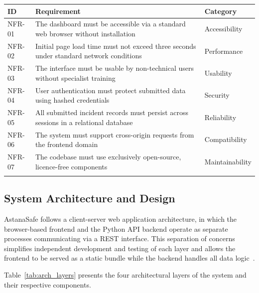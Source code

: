 \documentclass[12pt,a4paper]{report}
\begin{document}
  \renewcommand{\arraystretch}{1.4}
  \begin{tabularx}{\textwidth}{|>{\centering\arraybackslash}p{1.6cm}
                                |>{\raggedright\arraybackslash}X
                                |>{\centering\arraybackslash}p{2.8cm}|}
    \hline
    \textbf{ID} & \textbf{Requirement} & \textbf{Category} \\
    \hline
    NFR-01 & The dashboard must be accessible via a standard web browser without installation & Accessibility \\
    \hline
    NFR-02 & Initial page load time must not exceed three seconds under standard network conditions & Performance \\
    \hline
    NFR-03 & The interface must be usable by non-technical users without specialist training & Usability \\
    \hline
    NFR-04 & User authentication must protect submitted data using hashed credentials & Security \\
    \hline
    NFR-05 & All submitted incident records must persist across sessions in a relational database & Reliability \\
    \hline
    NFR-06 & The system must support cross-origin requests from the frontend domain & Compatibility \\
    \hline
    NFR-07 & The codebase must use exclusively open-source, licence-free components & Maintainability \\
    \hline

  \caption{\centering Non-functional requirements of the AstanaSafe dashboard}
  \label{tab:nonfunc_req}
  
  \end{tabularx}
  


\subsection{System Architecture and Design}

AstanaSafe follows a client-server web application architecture, in which the browser-based frontend and the Python API backend operate as separate processes communicating via a REST interface. This separation of concerns simplifies independent development and testing of each layer and allows the frontend to be served as a static bundle while the backend handles all data logic~\cite{praharaj2022}.

Table~\ref{tab:arch_layers} presents the four architectural layers of the system and their respective components.
\end{document}
